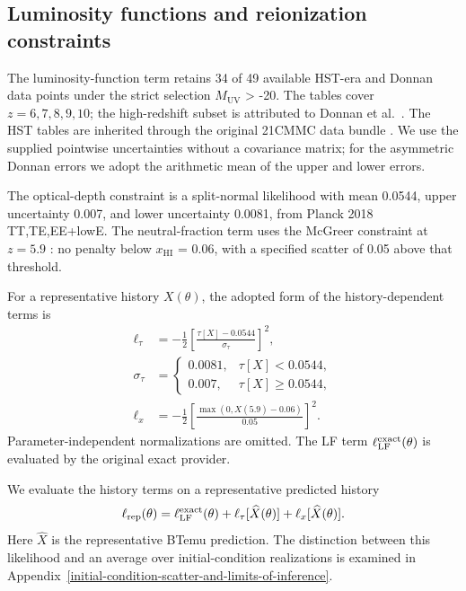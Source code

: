 \subsection{Luminosity functions and reionization constraints}\label{luminosity-functions-and-reionization-constraints}\label{observational-data-and-inference}

The luminosity-function term retains 34 of 49 available HST-era and Donnan data points under the strict selection \ensuremath{M_{\mathrm{UV}}} \textgreater{} -20. The tables cover $z=6,7,8,9,10$; the high-redshift subset is attributed to Donnan et al.~\cite{Donnan2024}. The HST tables are inherited through the original 21CMMC data bundle \cite{Greig2015,Park2019}. We use the supplied pointwise uncertainties without a covariance matrix; for the asymmetric Donnan errors we adopt the arithmetic mean of the upper and lower errors.

The optical-depth constraint \cite{Planck2018} is a split-normal likelihood with mean 0.0544, upper uncertainty 0.007, and lower uncertainty 0.0081, from Planck 2018 TT,TE,EE+lowE. The neutral-fraction term uses the McGreer constraint at $z=5.9$ \cite{McGreer2015}: no penalty below \ensuremath{x_{\mathrm{HI}}} = 0.06, with a specified scatter of 0.05 above that threshold.

For a representative history $X(\theta)$, the adopted form of the history-dependent terms is
\begin{align}
\ell_\tau&=-\frac{1}{2}\left[\frac{\tau[X]-0.0544}{\sigma_\tau}\right]^2,\\
\sigma_\tau&=\begin{cases}0.0081,&\tau[X]<0.0544,\\0.007,&\tau[X]\geq0.0544,\end{cases}\\
\ell_x&=-\frac{1}{2}\left[\frac{\max(0,X(5.9)-0.06)}{0.05}\right]^2.
\end{align}
Parameter-independent normalizations are omitted. The LF term $\ell_{\rm LF}^{\rm exact}(\theta)$ is evaluated by the original exact provider.

We evaluate the history terms on a representative predicted history
\begin{equation}
\ell_{\rm rep}(\theta)=\ell_{\rm LF}^{\rm exact}(\theta)
+\ell_\tau[\widehat X(\theta)]+\ell_x[\widehat X(\theta)].
\end{equation}
Here $\widehat X$ is the representative BTemu prediction. The distinction between this likelihood and an average over initial-condition realizations is examined in Appendix~\ref{initial-condition-scatter-and-limits-of-inference}.

